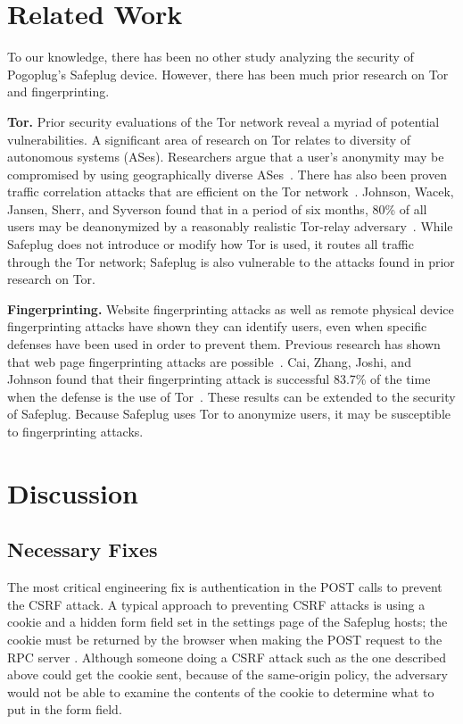 \documentclass[letterpaper,twocolumn,10pt]{article}
\begin{document}
\section{Related Work}
To our knowledge, there has been no other study analyzing the security of Pogoplug's Safeplug device.  However, there has been much prior research on Tor and fingerprinting.

{\bf Tor.} Prior security evaluations of the Tor network reveal a myriad of potential vulnerabilities.  A significant area of research on Tor relates to diversity of autonomous systems (ASes).  Researchers argue that a user's anonymity may be compromised by using geographically diverse ASes~\cite{feamster, murdoch2}.  There has also been proven traffic correlation attacks that are efficient on the Tor network~\cite{murdoch, overlier}.  Johnson, Wacek, Jansen, Sherr, and Syverson found that in a period of six months, 80\% of all users may be deanonymized by a reasonably realistic Tor-relay adversary~\cite{tor2}.  While Safeplug does not introduce or modify how Tor is used, it routes all traffic through the Tor network; Safeplug is also vulnerable to the attacks found in prior research on Tor.  

{\bf Fingerprinting.}  Website fingerprinting attacks as well as remote physical device fingerprinting attacks have shown they can identify users, even when specific defenses have been used in order to prevent them. Previous research has shown that web page fingerprinting attacks are possible~\cite{dyer, herrmann, panchenko}.  Cai, Zhang, Joshi, and Johnson found that their fingerprinting attack is successful 83.7\% of the time when the defense is the use of Tor~\cite{fingerprint1}.  These results can be extended to the security of Safeplug.  Because Safeplug uses Tor to anonymize users, it may be susceptible to fingerprinting attacks.

\section{Discussion}
\subsection{Necessary Fixes}
The most critical engineering fix is authentication in the POST calls to prevent the CSRF attack.  A typical approach to preventing CSRF attacks is using a cookie and a hidden form field set in the settings page of the Safeplug hosts; the cookie must be returned by the browser when making the POST request to the RPC server \cite{csrfdef}.  Although someone doing a CSRF attack such as the one described above could get the cookie sent, because of the same-origin policy, the adversary would not be able to examine the contents of the cookie to determine what to put in the form field.
\end{document}
